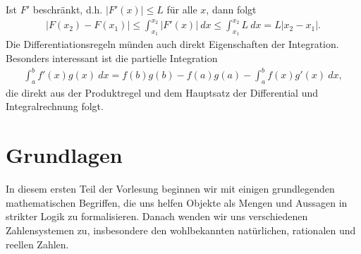 \documentclass[letterpaper,10pt,english]{jupyterBook}
\begin{document}
Ist \(F'\) beschränkt, d.h. \(\vert F'(x) \vert \leq L\) für alle \(x\), dann folgt
\begin{equation*}
\begin{split} \vert F(x_2) - F(x_1) \vert \leq  \int_{x_1}^{x_2}  \vert F'(x) \vert ~dx
\leq  \int_{x_1}^{x_2}  L ~dx = L \vert x_2 - x_1 \vert.\end{split}
\end{equation*}
Die Differentiationsregeln münden auch direkt Eigenschaften der Integration. Besonders interessant ist die partielle Integration
\begin{equation*}
\begin{split}  \int_a^b f'(x) g(x)~dx = f(b) g(b) - f(a) g(a) - \int_a^b f(x) g'(x)~dx, \end{split}
\end{equation*}
die direkt aus der Produktregel und dem Hauptsatz der Differential\sphinxhyphen{} und Integralrechnung folgt.


\chapter{Grundlagen}
\label{\detokenize{grundlagen/grundlagen:grundlagen}}\label{\detokenize{grundlagen/grundlagen::doc}}
In diesem ersten Teil der Vorlesung beginnen wir mit einigen grundlegenden mathematischen Begriffen, die uns helfen Objekte als Mengen und Aussagen in strikter Logik zu formalisieren. Danach wenden wir uns verschiedenen Zahlensystemen zu, insbesondere den wohlbekannten natürlichen, rationalen und reellen Zahlen.
\end{document}
